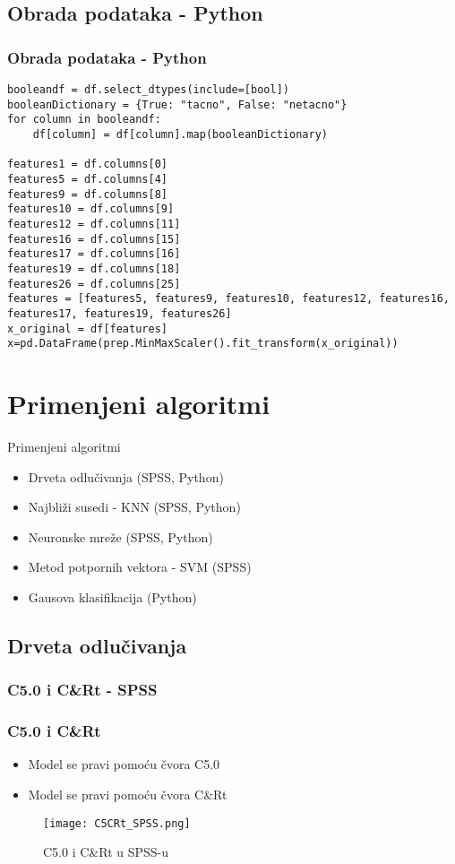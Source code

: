 \documentclass{beamer}
\begin{document}
\subsection*{Obrada podataka - Python}
\begin{frame}[fragile]
\frametitle{Obrada podataka - Python}
\begin{lstlisting}
booleandf = df.select_dtypes(include=[bool])
booleanDictionary = {True: "tacno", False: "netacno"}
for column in booleandf:
    df[column] = df[column].map(booleanDictionary)

features1 = df.columns[0]
features5 = df.columns[4]
features9 = df.columns[8]
features10 = df.columns[9]
features12 = df.columns[11]
features16 = df.columns[15]
features17 = df.columns[16]
features19 = df.columns[18]
features26 = df.columns[25]
features = [features5, features9, features10, features12, features16, features17, features19, features26]
x_original = df[features]
x=pd.DataFrame(prep.MinMaxScaler().fit_transform(x_original))
\end{lstlisting}
\end{frame}

\section{Primenjeni algoritmi}
\begin{frame}{Primenjeni algoritmi}
\begin{itemize}
	\item Drveta odlučivanja (SPSS, Python)
	\item Najbliži susedi - KNN (SPSS, Python)
	\item Neuronske mreže (SPSS, Python)
	\item Metod potpornih vektora - SVM (SPSS)
	\item Gausova klasifikacija (Python)
\end{itemize}
\end{frame}


\subsection{Drveta odlučivanja}
\subsubsection*{C5.0 i C\&Rt - SPSS}
\begin{frame}[fragile]
\frametitle{C5.0 i C\&Rt}
\begin{itemize}
 \item Model se pravi pomoću čvora C5.0
 \item Model se pravi pomoću čvora C\&Rt
\end{itemize}
\begin{figure}
\begin{center}
\texttt{[image: C5CRt\_SPSS.png]}
\end{center}
\caption{C5.0 i C\&Rt u  SPSS-u}
\end{figure}
\end{frame}
\end{document}
